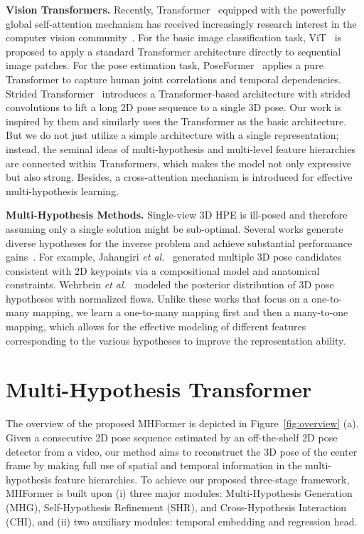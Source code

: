 \documentclass[10pt,twocolumn,letterpaper]{article}
\begin{document}
\noindent \textbf{Vision Transformers.}
Recently, Transformer~\cite{Attention} equipped with the powerfully global self-attention mechanism has received increasingly research interest in the computer vision community~\cite{he2021transreid,yang2021transformer,liu2021swin,lin2021end,han2021transformer}. 
For the basic image classification
task, ViT~\cite{dosovitskiy2020image} is proposed to apply a standard Transformer architecture directly to sequential image patches. 
For the pose estimation task, PoseFormer~\cite{poseformer} applies a pure Transformer to capture human joint correlations and temporal dependencies. 
Strided Transformer~\cite{strided} introduces a Transformer-based architecture with strided convolutions to lift a long 2D pose sequence to a single 3D pose. 
Our work is inspired by them and similarly uses the Transformer as the basic architecture. 
But we do not just utilize a simple architecture with a single representation; instead, the seminal ideas of multi-hypothesis and multi-level feature hierarchies are connected within Transformers, which makes the model not only expressive but also strong. 
Besides, a cross-attention mechanism is introduced for effective multi-hypothesis learning. 

\noindent \textbf{Multi-Hypothesis Methods.}
Single-view 3D HPE is ill-posed and therefore assuming only a single solution might be sub-optimal. 
Several works generate diverse hypotheses for the inverse problem and achieve substantial performance gains~\cite{jahangiri2017generating,li2020weakly,wehrbein2021probabilistic,oikarinen2021graphmdn}. 
For example,
Jahangiri \emph{et al.}~\cite{jahangiri2017generating} generated multiple 3D pose candidates consistent with 2D keypoints via a compositional model and anatomical constraints. 
Wehrbein \emph{et al.}~\cite{wehrbein2021probabilistic} modeled the posterior distribution of 3D pose hypotheses with normalized flows. 
Unlike these works that focus on a one-to-many mapping, we learn a one-to-many mapping first and then a many-to-one mapping, which allows for the effective modeling of different features corresponding to the various hypotheses to improve the representation ability. 

\section{Multi-Hypothesis Transformer}
The overview of the proposed MHFormer is depicted in Figure~\ref{fig:overview} (a). 
Given a consecutive 2D pose sequence estimated by an off-the-shelf 2D pose detector from a video, our method aims to reconstruct the 3D pose of the center frame by making full use of spatial and temporal information in the multi-hypothesis feature hierarchies. 
To achieve our proposed three-stage framework, MHFormer is built upon (i) three major modules: Multi-Hypothesis Generation (MHG), Self-Hypothesis Refinement (SHR), and Cross-Hypothesis Interaction (CHI), and (ii) two auxiliary modules: temporal embedding and regression head. 
\end{document}
